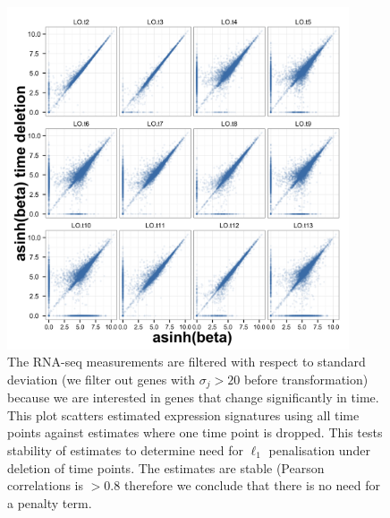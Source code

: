 \begin{figure}
  \centering
  \includegraphics[width=0.9\textwidth]{pics/no-pen-data.png}
  \caption{The RNA-seq measurements are filtered with respect to standard deviation (we filter out genes with $\sigma_j > 20$ before transformation) because we are interested in genes that change significantly in time. This plot scatters estimated expression signatures using all time points against estimates where one time point is dropped. This tests stability of estimates to determine need for $\ell_1$ penalisation under deletion of time points. The estimates are stable (Pearson correlations is $>0.8$ therefore we conclude that there is no need for a penalty term.}
  \label{fig:data-pen}
\end{figure}

